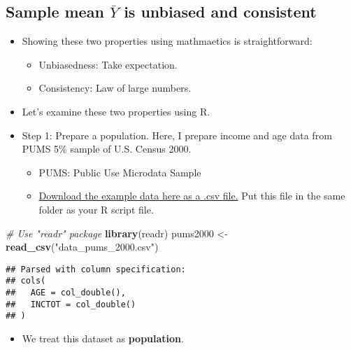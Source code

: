 \documentclass[]{book}
\newenvironment{Shaded}{\begin{snugshade}}{\end{snugshade}}
\newcommand{\CommentTok}[1]{\textcolor[rgb]{0.56,0.35,0.01}{\textit{#1}}}
\newcommand{\KeywordTok}[1]{\textcolor[rgb]{0.13,0.29,0.53}{\textbf{#1}}}
\newcommand{\NormalTok}[1]{#1}
\newcommand{\StringTok}[1]{\textcolor[rgb]{0.31,0.60,0.02}{#1}}
\providecommand{\tightlist}{%
  \setlength{\itemsep}{0pt}\setlength{\parskip}{0pt}}
\begin{document}
\hypertarget{sample-mean-bary-is-unbiased-and-consistent}{%
\subsection{\texorpdfstring{Sample mean \(\bar{Y}\) is unbiased and consistent}{Sample mean \textbackslash{}bar\{Y\} is unbiased and consistent}}\label{sample-mean-bary-is-unbiased-and-consistent}}

\begin{itemize}
\item
  Showing these two properties using mathmaetics is straightforward:

  \begin{itemize}
  \tightlist
  \item
    Unbiasedness: Take expectation.
  \item
    Consistency: Law of large numbers.
  \end{itemize}
\item
  Let's examine these two properties using R.
\item
  Step 1: Prepare a population. Here, I prepare income and age data from PUMS 5\% sample of U.S. Census 2000.

  \begin{itemize}
  \tightlist
  \item
    PUMS: Public Use Microdata Sample
  \item
    \href{data_pums_2000.csv}{Download the example data here as a .csv file.} Put this file in the same folder as your R script file.
  \end{itemize}
\end{itemize}

\begin{Shaded}
\begin{Highlighting}[]
\CommentTok{# Use "readr" package}
\KeywordTok{library}\NormalTok{(readr)}
\NormalTok{pums2000 <-}\StringTok{ }\KeywordTok{read_csv}\NormalTok{(}\StringTok{"data_pums_2000.csv"}\NormalTok{) }
\end{Highlighting}
\end{Shaded}

\begin{verbatim}
## Parsed with column specification:
## cols(
##   AGE = col_double(),
##   INCTOT = col_double()
## )
\end{verbatim}

\begin{itemize}
\tightlist
\item
  We treat this dataset as \textbf{population}.
\end{itemize}
\end{document}
